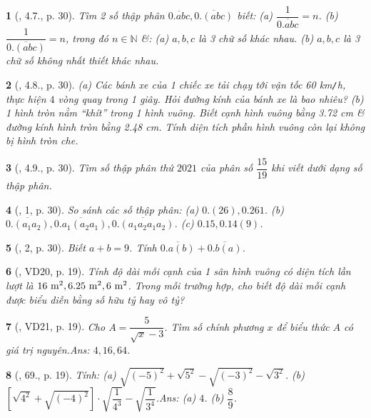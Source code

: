 \documentclass{article}
\newtheorem{baitoan}{}
\begin{document}
\begin{baitoan}[\cite{Binh_boi_duong_Toan_7_tap_1}, 4.7., p. 30]
	Tìm 2 số thập phân $\overline{0.abc},\overline{0.(abc)}$ biết: (a) $\dfrac{1}{\overline{0.abc}} = n$. (b) $\dfrac{1}{\overline{0.(abc)}} = n$, trong đó $n\in\mathbb{N}$ \&: (a) $a,b,c$ là 3 chữ số khác nhau. (b) $a,b,c$ là 3 chữ số không nhất thiết khác nhau.
\end{baitoan}

\begin{baitoan}[\cite{Binh_boi_duong_Toan_7_tap_1}, 4.8., p. 30]
	(a) Các bánh xe của 1 chiếc xe tải chạy tới vận tốc {\rm60 km{\tt/}h}, thực hiện $4$ vòng quay trong 1 giây. Hỏi đường kính của bánh xe là bao nhiêu? (b) 1 hình tròn nằm ``khít'' trong 1 hình vuông. Biết cạnh hình vuông bằng {\rm3.72 cm} \& đường kính hình tròn bằng {\rm2.48 cm}. Tính diện tích phần hình vuông còn lại không bị hình tròn che.
\end{baitoan}

\begin{baitoan}[\cite{Binh_boi_duong_Toan_7_tap_1}, 4.9., p. 30]
	Tìm số thập phân thứ $2021$ của phân số $\dfrac{15}{19}$ khi viết dưới dạng số thập phân.
\end{baitoan}

\begin{baitoan}[\cite{Binh_boi_duong_Toan_7_tap_1}, 1, p. 30]
	So sánh các số thập phân: (a) $0.(26),0.261$. (b) $\overline{0.(a_1a_2)},\overline{0.a_1(a_2a_1)},\overline{0.(a_1a_2a_1a_2)}$. (c) $0.15,0.14(9)$.
\end{baitoan}

\begin{baitoan}[\cite{Binh_boi_duong_Toan_7_tap_1}, 2, p. 30]
	Biết $a + b = 9$. Tính $\overline{0.a(b)} + \overline{0.b(a)}$.
\end{baitoan}

\begin{baitoan}[\cite{Tuyen_Toan_7}, VD20, p. 19]
	Tính độ dài mỗi cạnh của 1 sân hình vuông có diện tích lần lượt là $\rm16\ m^2,6.25\ m^2,\rm6\ m^2$. Trong mỗi trường hợp, cho biết độ dài mỗi cạnh được biểu diễn bằng số hữu tỷ hay vô tỷ?
\end{baitoan}

\begin{baitoan}[\cite{Tuyen_Toan_7}, VD21, p. 19]
	Cho $A = \dfrac{5}{\sqrt{x} - 3}$. Tìm số chính phương $x$ để biểu thức $A$ có giá trị nguyên.\hfill{\sf Ans:} $4,16,64$.
\end{baitoan}

\begin{baitoan}[\cite{Tuyen_Toan_7}, 69., p. 19]
	Tính: (a) $\sqrt{(-5)^2} + \sqrt{5^2} - \sqrt{(-3)^2} - \sqrt{3^2}$. (b) $\left[\sqrt{4^2} + \sqrt{(-4)^2}\right]\cdot\sqrt{\dfrac{1}{4^3}} - \sqrt{\dfrac{1}{3^4}}$.\hfill{\sf Ans:} (a) $4$. (b) $\dfrac{8}{9}$.
\end{baitoan}
\end{document}
